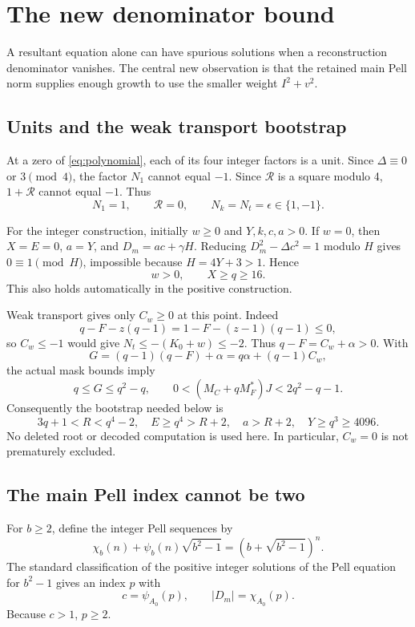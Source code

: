 \documentclass[11pt]{article}
\theoremstyle{definition}\newtheorem{definition}[theorem]{Definition}
\theoremstyle{remark}\newtheorem{remark}[theorem]{Remark}
\newcommand{\Res}{\mathcal R}\newcommand{\pc}{\operatorname{pc}}
\begin{document}
\section{The new denominator bound}
\label{sec:denominator}
A resultant equation alone can have spurious solutions when a reconstruction denominator vanishes. The central new observation is that the retained main Pell norm supplies enough growth to use the smaller weight $I^2+v^2$.

\subsection{Units and the weak transport bootstrap}
At a zero of \eqref{eq:polynomial}, each of its four integer factors is a unit. Since $\Delta\equiv0$ or $3\pmod4$, the factor $N_1$ cannot equal $-1$. Since $\Res$ is a square modulo 4, $1+\Res$ cannot equal $-1$. Thus
\begin{equation}
N_1=1,\qquad\Res=0,\qquad N_k=N_t=\epsilon\in\{1,-1\}.\label{eq:units}
\end{equation}

For the integer construction, initially $w\ge0$ and $Y,k,c,a>0$. If $w=0$, then $X=E=0$, $a=Y$, and $D_m=ac+\gamma H$. Reducing $D_m^2-\Delta c^2=1$ modulo $H$ gives $0\equiv1\pmod H$, impossible because $H=4Y+3>1$. Hence
\begin{equation}
w>0,\qquad X\ge q\ge16.\label{eq:zerow}
\end{equation}
This also holds automatically in the positive construction.

Weak transport gives only $C_w\ge0$ at this point. Indeed
\[
q-F-z(q-1)=1-F-(z-1)(q-1)\le0,
\]
so $C_w\le-1$ would give $N_t\le-(K_0+w)\le-2$. Thus $q-F=C_w+\alpha>0$. With
\[
G=(q-1)(q-F)+\alpha=q\alpha+(q-1)C_w,
\]
the actual mask bounds imply
\[
q\le G\le q^2-q,\qquad
0<(M_C+qM_F^*)J<2q^2-q-1.
\]
Consequently the bootstrap needed below is
\begin{equation}
3q+1<R<q^4-2,\quad E\ge q^4>R+2,\quad a>R+2,
\quad Y\ge q^3\ge4096.\label{eq:bootstrap}
\end{equation}
No deleted root or decoded computation is used here. In particular, $C_w=0$ is not prematurely excluded.

\subsection{The main Pell index cannot be two}
For $b\ge2$, define the integer Pell sequences by
\[
\chi_b(n)+\psi_b(n)\sqrt{b^2-1}
 =(b+\sqrt{b^2-1})^n.
\]
The standard classification of the positive integer solutions of the Pell equation for $b^2-1$ gives an index $p$ with
\[
c=\psi_{A_0}(p),\qquad |D_m|=\chi_{A_0}(p).
\]
Because $c>1$, $p\ge2$.
\end{document}
